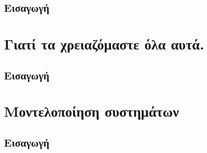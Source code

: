 \documentclass[a4paper,12pt,twoside]{report}
\begin{document}
{		\section{Εισαγωγή}
			\paragraph{} {
			}
			
	\chapter{Γιατί τα χρειαζόμαστε όλα αυτά.}
		\label{κεφ.:Γιατί τα χρειαζόμαστε όλα αυτά.}

		\section{Εισαγωγή}
			\paragraph{} {
			}
				
				
				
	\chapter{Μοντελοποίηση συστημάτων}
		\label{κεφ.:Μοντελοποίηση συστημάτων}

		\section{Εισαγωγή}
}
\end{document}
